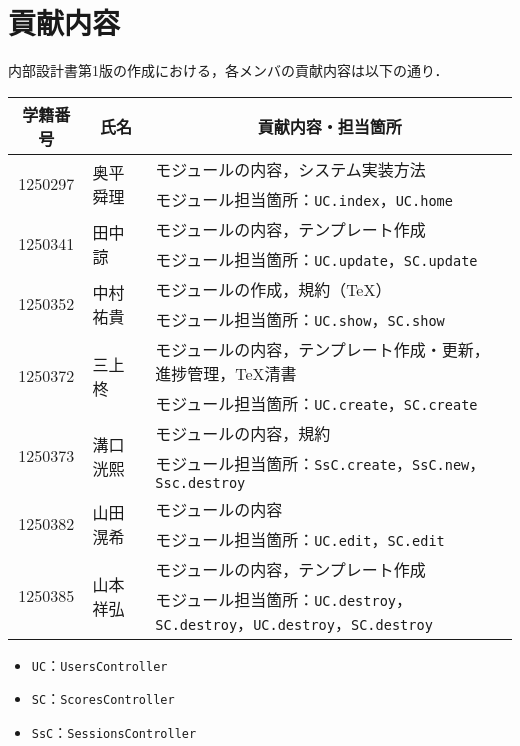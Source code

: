 \chapter{貢献内容}
内部設計書第1版の作成における，各メンバの貢献内容は以下の通り．
\begin{table}[h]
    \centering
    \begin{tabularx}{\textwidth}{cll}
        \multicolumn{1}{c}{学籍番号} & \multicolumn{1}{c}{氏名} & \multicolumn{1}{c}{貢献内容・担当箇所}\\
        \hline
        \multirow{2}{*}{1250297} & \multirow{2}{*}{奥平 舜理} & モジュールの内容，システム実装方法\\
                                 &                        & モジュール担当箇所：\texttt{UC.index}，\texttt{UC.home}\\
        \hline
        \multirow{2}{*}{1250341} & \multirow{2}{*}{田中 諒}  & モジュールの内容，テンプレート作成\\
                                 &                        & モジュール担当箇所：\texttt{UC.update}，\texttt{SC.update}\\
        \hline
        \multirow{2}{*}{1250352} & \multirow{2}{*}{中村 祐貴} &  モジュールの作成，規約（\TeX ）\\
                                 &                        & モジュール担当箇所：\texttt{UC.show}，\texttt{SC.show}\\
        \hline
        \multirow{2}{*}{1250372} & \multirow{2}{*}{三上 柊}  &  モジュールの内容，テンプレート作成・更新，進捗管理，\TeX 清書 \\
                                 &                        & モジュール担当箇所：\texttt{UC.create}，\texttt{SC.create}\\
        \hline
        \multirow{2}{*}{1250373} & \multirow{2}{*}{溝口 洸熙} & モジュールの内容，規約\\
                                 &                        & モジュール担当箇所：\texttt{SsC.create}，\texttt{SsC.new}，\texttt{Ssc.destroy}\\
        \hline
        \multirow{2}{*}{1250382} & \multirow{2}{*}{山田 滉希} & モジュールの内容\\
                                 &                        & モジュール担当箇所：\texttt{UC.edit}，\texttt{SC.edit}\\
        \hline
        \multirow{2}{*}{1250385} & \multirow{2}{*}{山本 祥弘} & モジュールの内容，テンプレート作成\\
                                 &                        & モジュール担当箇所：\texttt{UC.destroy}，\texttt{SC.destroy}，\texttt{UC.destroy}，\texttt{SC.destroy}\\
        \hline
    \end{tabularx}
\end{table}
\begin{itemize}
    \item \texttt{UC}：\texttt{UsersController}
    \item \texttt{SC}：\texttt{ScoresController}
    \item \texttt{SsC}：\texttt{SessionsController}
\end{itemize}